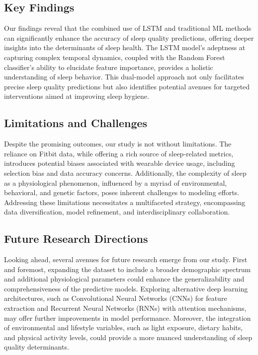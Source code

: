 \documentclass[10pt]{extarticle}
\begin{document}
\subsection{Key Findings}

Our findings reveal that the combined use of LSTM and traditional ML methods can significantly enhance the accuracy of sleep quality predictions, offering deeper insights into the determinants of sleep health. The LSTM model's adeptness at capturing complex temporal dynamics, coupled with the Random Forest classifier's ability to elucidate feature importance, provides a holistic understanding of sleep behavior. This dual-model approach not only facilitates precise sleep quality predictions but also identifies potential avenues for targeted interventions aimed at improving sleep hygiene.

\subsection{Limitations and Challenges}

Despite the promising outcomes, our study is not without limitations. The reliance on Fitbit data, while offering a rich source of sleep-related metrics, introduces potential biases associated with wearable device usage, including selection bias and data accuracy concerns. Additionally, the complexity of sleep as a physiological phenomenon, influenced by a myriad of environmental, behavioral, and genetic factors, poses inherent challenges to modeling efforts. Addressing these limitations necessitates a multifaceted strategy, encompassing data diversification, model refinement, and interdisciplinary collaboration.

\subsection{Future Research Directions}

Looking ahead, several avenues for future research emerge from our study. First and foremost, expanding the dataset to include a broader demographic spectrum and additional physiological parameters could enhance the generalizability and comprehensiveness of the predictive models. Exploring alternative deep learning architectures, such as Convolutional Neural Networks (CNNs) for feature extraction and Recurrent Neural Networks (RNNs) with attention mechanisms, may offer further improvements in model performance. Moreover, the integration of environmental and lifestyle variables, such as light exposure, dietary habits, and physical activity levels, could provide a more nuanced understanding of sleep quality determinants.
\end{document}

